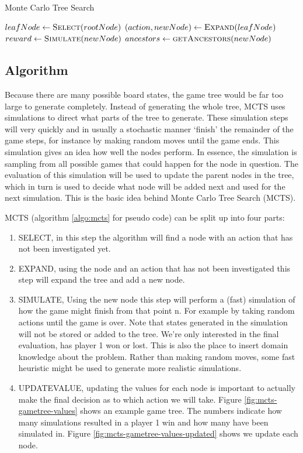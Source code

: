 \documentclass[
11pt, %
english, %
singlespacing, %
headsepline, %
]{MastersDoctoralThesis} %
\begin{document}
\begin{algorithm}
\caption{Monte Carlo Tree Search}
\label{algo:mcts}
\begin{algorithmic}
\State $leafNode \gets \Call{Select}{rootNode}$
\State $(action, newNode) \gets \Call{Expand}{leafNode}$
\State $reward \gets \Call{Simulate}{newNode}$
\State $ancestors \gets \Call{getAncestors}{newNode}$
\State \Return {}
\EndWhile
\State \Return {}
\EndFunction
\end{algorithmic}
\end{algorithm}
\subsection{Algorithm}
Because there are many possible board states, the game tree would be far too large to generate completely. Instead of generating the whole tree, MCTS uses simulations to direct what parts of the tree to generate. These simulation steps will very quickly and in usually a stochastic manner `finish' the remainder of the game steps, for instance by making random moves until the game ends. This simulation gives an idea how well the nodes perform. In essence, the simulation is sampling from all possible games that could happen for the node in question. The evaluation of this simulation will be used to update the parent nodes in the tree, which in turn is used to decide what node will be added next and used for the next simulation. This is the basic idea behind Monte Carlo Tree Search (MCTS).

MCTS (algorithm \ref{algo:mcts} for pseudo code) can be split up into four parts:
\begin{enumerate}
    \item SELECT, in this step the algorithm will find a node with an action that has not been investigated yet.
    \item EXPAND, using the node and an action that has not been investigated this step will expand the tree and add a new node.
    \item SIMULATE, Using the new node this step will perform a (fast) simulation of how the game might finish from that point n. For example by taking random actions until the game is over. Note that states generated in the simulation will not be stored or added to the tree. We're only interested in the final evaluation, has player 1 won or lost. This is also the place to insert domain knowledge about the problem. Rather than making random moves, some fast heuristic might be used to generate more realistic simulations.
    \item UPDATEVALUE, updating the values for each node is important to actually make the final decision as to which action we will take. Figure \ref{fig:mcts-gametree-values} shows an example game tree. The numbers indicate how many simulations resulted in a player 1 win and how many have been simulated in. Figure \ref{fig:mcts-gametree-values-updated} shows we update each node. 
\end{enumerate}
\end{document}
